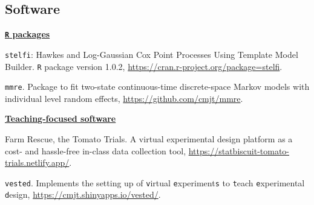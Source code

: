 \documentclass[10pt,a4paper]{moderncv}
\begin{document}
\vspace{2pt}

\subsection{Software}


\underline{\textbf{\texttt{R} packages}}\\
\vspace{-3pt}

\texttt{stelfi}: Hawkes and Log-Gaussian Cox Point Processes Using Template Model Builder. \texttt{R} package version 1.0.2, \url{https://cran.r-project.org/package=stelfi}.\\

\vspace{-3pt}

\texttt{mmre}. Package to fit two-state continuous-time discrete-space Markov models with individual level random effects, \url{https://github.com/cmjt/mmre}.\\






\vspace{2pt}

\underline{\textbf{Teaching-focused software}}\\
\vspace{-3pt}

Farm Rescue, the Tomato Trials. A virtual experimental design platform as a cost- and hassle-free in-class data collection tool, \url{https://statbiscuit-tomato-trials.netlify.app/}.\\

\vspace{-3pt}

\texttt{vested}. Implements the setting up of \texttt{v}irtual \texttt{e}xperiment\texttt{s} to \texttt{t}each \texttt{e}xperimental \texttt{d}esign, \url{https://cmjt.shinyapps.io/vested/}.\\

\vspace{2pt}
\end{document}
